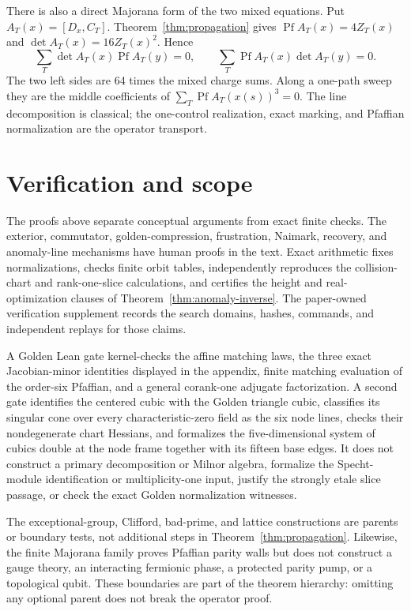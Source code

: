 \documentclass[11pt]{article}
\theoremstyle{definition}
\theoremstyle{remark}
\newcommand{\Pf}{\operatorname{Pf}}
\begin{document}
There is also a direct Majorana form of the two mixed equations.  Put
\(A_T(x)=[D_x,C_T]\).  Theorem~\ref{thm:propagation} gives
\(\Pf A_T(x)=4Z_T(x)\) and
\(\det A_T(x)=16Z_T(x)^2\).  Hence
\[
 \boxed{\sum_T\det A_T(x)\Pf A_T(y)=0},\qquad
 \boxed{\sum_T\Pf A_T(x)\det A_T(y)=0}.
\]
The two left sides are 64 times the mixed charge sums.  Along a one-path
sweep they are the middle coefficients of
\(\sum_T\Pf A_T(x(s))^3=0\).  The line decomposition is classical; the
one-control realization, exact marking, and Pfaffian normalization are the
operator transport.

\section{Verification and scope}

The proofs above separate conceptual arguments from exact finite checks.
The exterior, commutator, golden-compression, frustration, Naimark, recovery,
and anomaly-line mechanisms have human proofs in the text.  Exact arithmetic
fixes normalizations, checks finite orbit tables, independently reproduces
the collision-chart and rank-one-slice calculations, and certifies the height
and real-optimization clauses of Theorem~\ref{thm:anomaly-inverse}.  The
paper-owned verification supplement records the search domains, hashes,
commands, and independent replays for those claims.

A Golden Lean gate kernel-checks the affine matching laws, the three exact
Jacobian-minor identities displayed in the appendix, finite matching
evaluation of the order-six Pfaffian, and a general corank-one adjugate
factorization.  A second gate identifies the centered cubic with the Golden
triangle cubic, classifies its singular cone over every characteristic-zero
field as the six node lines, checks their nondegenerate chart Hessians, and
formalizes the five-dimensional system of cubics double at the node frame
together with its fifteen base edges.  It does not construct a primary
decomposition or Milnor algebra, formalize the Specht-module identification
or multiplicity-one input, justify the strongly etale slice passage, or check
the exact Golden normalization witnesses.

The exceptional-group, Clifford, bad-prime, and lattice constructions are
parents or boundary tests, not additional steps in
Theorem~\ref{thm:propagation}.  Likewise, the finite Majorana family proves
Pfaffian parity walls but does not construct a gauge theory, an interacting
fermionic phase, a protected parity pump, or a topological qubit.  These
boundaries are part of the theorem hierarchy: omitting any optional parent
does not break the operator proof.
\end{document}
